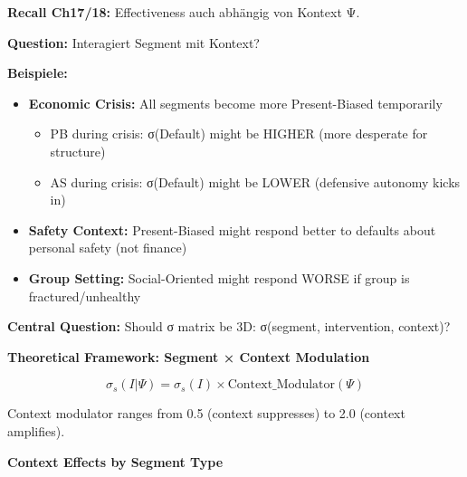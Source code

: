 \begin{tcolorbox}[colback=green!5!white, colframe=green!75!black, title=\textbf{Problem: σ-Werte könnten selbst Kontext-abhängig sein}]

\textbf{Recall Ch17/18:} Effectiveness auch abhängig von Kontext Ψ.

\textbf{Question:} Interagiert Segment mit Kontext?

\textbf{Beispiele:}
\begin{itemize}[nosep]
\item \textbf{Economic Crisis:} All segments become more Present-Biased temporarily
  \begin{itemize}[nosep]
  \item PB during crisis: σ(Default) might be HIGHER (more desperate for structure)
  \item AS during crisis: σ(Default) might be LOWER (defensive autonomy kicks in)
  \end{itemize}
\item \textbf{Safety Context:} Present-Biased might respond better to defaults about personal safety (not finance)
\item \textbf{Group Setting:} Social-Oriented might respond WORSE if group is fractured/unhealthy
\end{itemize}

\textbf{Central Question:} Should σ matrix be 3D: σ(segment, intervention, context)?

\end{tcolorbox}

\textbf{Theoretical Framework: Segment × Context Modulation}

\begin{definition}
\label{def:19-sigma-context}

\begin{equation}
\sigma_s(I | \Psi) = \sigma_s(I) \times \text{Context\_Modulator}(\Psi)
\label{eq:19-sigma-context}
\end{equation}

Context modulator ranges from 0.5 (context suppresses) to 2.0 (context amplifies).

\end{definition}

\textbf{Context Effects by Segment Type}

